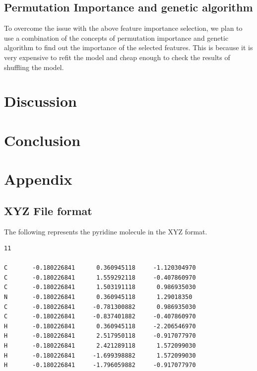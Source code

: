 \documentclass[11pt]{article}
\begin{document}
\subsection{Permutation Importance and genetic algorithm}
To overcome the issue with the above feature importance selection, we plan to use a combination of the concepts of permutation importance and genetic algorithm to find out the importance of the selected features.
This is because it is very expensive to refit the model and cheap enough to check the results of shuffling the model.

\section{Discussion}


\section{Conclusion}




\section{Appendix}
\subsection{XYZ File format}
\label{XYZFileexampleref}
The following represents the pyridine molecule in the XYZ format.
\begin{verbatim}
11

C       -0.180226841      0.360945118     -1.120304970
C       -0.180226841      1.559292118     -0.407860970
C       -0.180226841      1.503191118      0.986935030
N       -0.180226841      0.360945118      1.29018350
C       -0.180226841     -0.781300882      0.986935030
C       -0.180226841     -0.837401882     -0.407860970
H       -0.180226841      0.360945118     -2.206546970
H       -0.180226841      2.517950118     -0.917077970
H       -0.180226841      2.421289118      1.572099030
H       -0.180226841     -1.699398882      1.572099030
H       -0.180226841     -1.796059882     -0.917077970
\end{verbatim}
\end{document}
